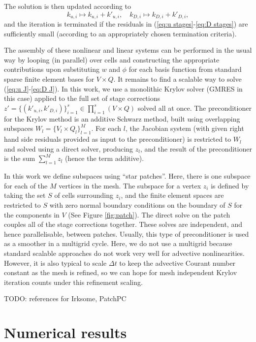 \documentclass[a4paper]{article}
\begin{document}
The solution is then updated according to
\begin{equation}
  k_{u,i}\mapsto k_{u,i} + k'_{u,i}, \quad
  k_{D,i}\mapsto k_{D,i} + k'_{D,i},
\end{equation}
and the iteration is terminated if the residuals in (\ref{eq:u
  stages}-\ref{eq:D stages}) are sufficiently small (according
to an appropriately chosen termination criteria).

The assembly of these nonlinear and linear systems can be performed in
the usual way by looping (in parallel) over cells and constructing the
appropriate contributions upon substituting $w$ and $\phi$ for each
basis function from standard sparse finite element bases for $V\times
Q$. It remains to find a scalable way to solve (\ref{eq:u J}-\ref{eq:D
  J}). In this work, we use a monolithic Krylov solver (GMRES in this
case) applied to the full set of stage corrections $z' = \{(k'_{u,i},
k'_{D,i})\}_{i=1}^s \in \prod_{i=1}^s(V\times Q)$ solved all at
once. The preconditioner for the Krylov method is an additive Schwarz
method, built using overlapping subspaces $W_l=\{V_l\times
Q_l\}_{l=1}^M$. For each $l$, the Jacobian system (with given right
hand side residuals provided as input to the preconditioner) is
restricted to $W_l$ and solved using a direct solver, producing $z_l$,
and the result of the preconditioner is the sum $\sum_{l=1}^Mz_l$
(hence the term additive).

In this work we define subspaces using ``star patches''.  Here, there
is one subspace for each of the $M$ vertices in the mesh.  The
subspace for a vertex $z_i$ is defined by taking the set $S$ of cells
surrounding $z_i$, and the finite element spaces are restricted to $S$
with zero normal boundary conditions on the boundary of $S$ for the
components in $V$ (See Figure \ref{fig:patch}). The direct solve on
the patch couples all of the stage corrections together. These
solves are independent, and hence parallelisable, between patches.
Usually, this
type of preconditioner is used as a smoother in a multigrid
cycle. Here, we do not use a multigrid because standard scalable
approaches do not work very well for advective
nonlinearities. However, it is also typical to scale $\Delta t$ to
keep the advective Courant number constant as the mesh is refined, so
we can hope for mesh independent Krylov iteration counts under this
refinement scaling.

TODO: references for Irksome, PatchPC

\section{Numerical results}
\end{document}
